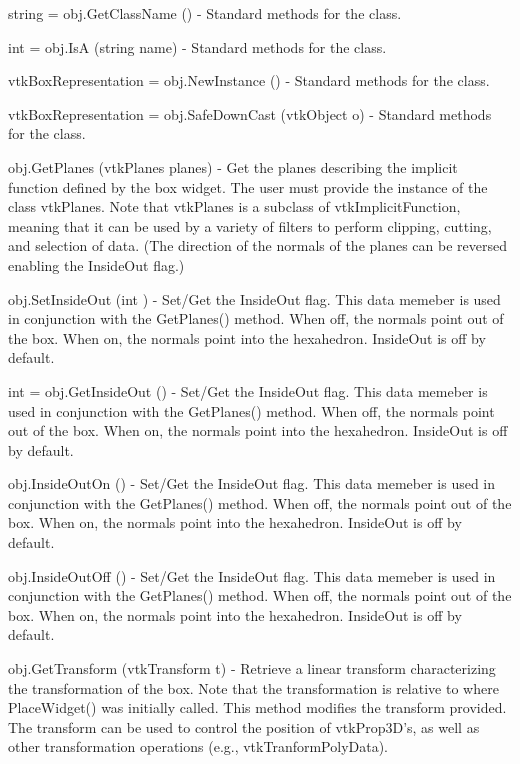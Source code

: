 \begin{DoxyItemize}
\item {\ttfamily string = obj.\-Get\-Class\-Name ()} -\/ Standard methods for the class.  
\item {\ttfamily int = obj.\-Is\-A (string name)} -\/ Standard methods for the class.  
\item {\ttfamily vtk\-Box\-Representation = obj.\-New\-Instance ()} -\/ Standard methods for the class.  
\item {\ttfamily vtk\-Box\-Representation = obj.\-Safe\-Down\-Cast (vtk\-Object o)} -\/ Standard methods for the class.  
\item {\ttfamily obj.\-Get\-Planes (vtk\-Planes planes)} -\/ Get the planes describing the implicit function defined by the box widget. The user must provide the instance of the class vtk\-Planes. Note that vtk\-Planes is a subclass of vtk\-Implicit\-Function, meaning that it can be used by a variety of filters to perform clipping, cutting, and selection of data. (The direction of the normals of the planes can be reversed enabling the Inside\-Out flag.)  
\item {\ttfamily obj.\-Set\-Inside\-Out (int )} -\/ Set/\-Get the Inside\-Out flag. This data memeber is used in conjunction with the Get\-Planes() method. When off, the normals point out of the box. When on, the normals point into the hexahedron. Inside\-Out is off by default.  
\item {\ttfamily int = obj.\-Get\-Inside\-Out ()} -\/ Set/\-Get the Inside\-Out flag. This data memeber is used in conjunction with the Get\-Planes() method. When off, the normals point out of the box. When on, the normals point into the hexahedron. Inside\-Out is off by default.  
\item {\ttfamily obj.\-Inside\-Out\-On ()} -\/ Set/\-Get the Inside\-Out flag. This data memeber is used in conjunction with the Get\-Planes() method. When off, the normals point out of the box. When on, the normals point into the hexahedron. Inside\-Out is off by default.  
\item {\ttfamily obj.\-Inside\-Out\-Off ()} -\/ Set/\-Get the Inside\-Out flag. This data memeber is used in conjunction with the Get\-Planes() method. When off, the normals point out of the box. When on, the normals point into the hexahedron. Inside\-Out is off by default.  
\item {\ttfamily obj.\-Get\-Transform (vtk\-Transform t)} -\/ Retrieve a linear transform characterizing the transformation of the box. Note that the transformation is relative to where Place\-Widget() was initially called. This method modifies the transform provided. The transform can be used to control the position of vtk\-Prop3\-D's, as well as other transformation operations (e.\-g., vtk\-Tranform\-Poly\-Data).  

\end{DoxyItemize}
